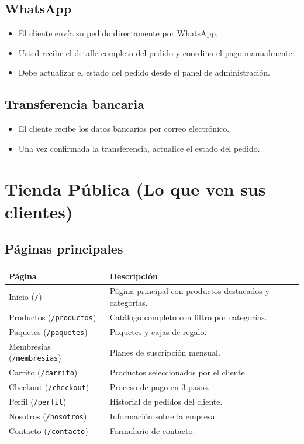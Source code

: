 \documentclass[12pt,a4paper]{article}
\begin{document}
\subsection{WhatsApp}
\begin{itemize}[leftmargin=2cm]
    \item El cliente envía su pedido directamente por WhatsApp.
    \item Usted recibe el detalle completo del pedido y coordina el pago manualmente.
    \item Debe actualizar el estado del pedido desde el panel de administración.
\end{itemize}

\subsection{Transferencia bancaria}
\begin{itemize}[leftmargin=2cm]
    \item El cliente recibe los datos bancarios por correo electrónico.
    \item Una vez confirmada la transferencia, actualice el estado del pedido.
\end{itemize}

\section{Tienda Pública (Lo que ven sus clientes)}

\subsection{Páginas principales}

\begin{table}[h]
\centering
\begin{tabularx}{\textwidth}{lX}
    \toprule
    \textbf{Página} & \textbf{Descripción} \\
    \midrule
    Inicio (\texttt{/})             & Página principal con productos destacados y categorías. \\
    Productos (\texttt{/productos}) & Catálogo completo con filtro por categorías. \\
    Paquetes (\texttt{/paquetes})   & Paquetes y cajas de regalo. \\
    Membresías (\texttt{/membresias}) & Planes de suscripción mensual. \\
    Carrito (\texttt{/carrito})     & Productos seleccionados por el cliente. \\
    Checkout (\texttt{/checkout})   & Proceso de pago en 3 pasos. \\
    Perfil (\texttt{/perfil})       & Historial de pedidos del cliente. \\
    Nosotros (\texttt{/nosotros})   & Información sobre la empresa. \\
    Contacto (\texttt{/contacto})   & Formulario de contacto. \\
    \bottomrule
\end{tabularx}
\end{table}
\end{document}
